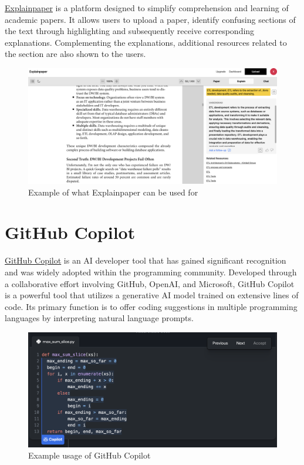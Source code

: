 \documentclass[
]{book}
\begin{document}
\href{https://www.explainpaper.com/}{Explainpaper} is a platform designed to simplify comprehension and learning of academic papers. It allows users to upload a paper, identify confusing sections of the text through highlighting and subsequently receive corresponding explanations. Complementing the explanations, additional resources related to the section are also shown to the users.

\begin{figure}

{\centering \includegraphics[width=0.9\linewidth]{Explainpaper_Example} 

}

\caption{Example of what Explainpaper can be used for}\label{fig:unnamed-chunk-12}
\end{figure}

\hypertarget{github-copilot}{%
\section{GitHub Copilot}\label{github-copilot}}

\href{https://github.com/features/copilot}{GitHub Copilot} is an AI developer tool that has gained significant recognition and was widely adopted within the programming community. Developed through a collaborative effort involving GitHub, OpenAI, and Microsoft, GitHub Copilot is a powerful tool that utilizes a generative AI model trained on extensive lines of code. Its primary function is to offer coding suggestions in multiple programming languages by interpreting natural language prompts.

\begin{figure}

{\centering \includegraphics[width=0.95\linewidth]{GitHub_Copilot_Example} 

}

\caption{Example usage of GitHub Copilot}\label{fig:unnamed-chunk-13}
\end{figure}
\end{document}
